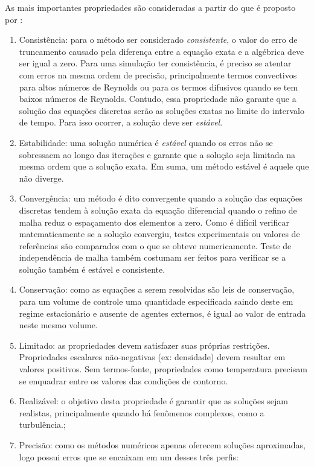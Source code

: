 As mais importantes propriedades são consideradas a partir do que é proposto por \citeauthor{Ferziger&Peric2020}:

\begin{enumerate}
    \item Consistência: para o método ser considerado \textit{consistente}, o valor do erro de truncamento causado pela diferença entre a equação exata e a algébrica deve ser igual a zero. Para uma simulação ter consistência, é preciso se atentar com erros na mesma ordem de precisão, principalmente termos convectivos para altos números de Reynolds ou para os termos difusivos quando se tem baixos números de Reynolds. Contudo, essa propriedade não garante que a solução das equações discretas serão as soluções exatas no limite do intervalo de tempo. Para isso ocorrer, a solução deve ser \textit{estável}.
    \item Estabilidade: uma solução numérica é \textit{estável} quando os erros não se sobressaem ao longo das iterações e garante que a solução seja limitada na mesma ordem que a solução exata. Em suma, um método estável é aquele que não diverge.
    \item Convergência: um método é dito convergente quando a solução das equações discretas tendem à solução exata da equação diferencial quando o refino de malha reduz o espaçamento dos elementos a zero. Como é difícil verificar matematicamente se a solução convergiu, testes experimentais ou valores de referências são comparados com o que se obteve numericamente. Teste de independência de malha também costumam ser feitos para verificar se a solução também é estável e consistente.
    \item Conservação: como as equações a serem resolvidas são leis de conservação, para um volume de controle uma quantidade especificada saindo deste em regime estacionário e ausente de agentes externos, é igual ao valor de entrada neste mesmo volume.
    \item Limitado: as propriedades devem satisfazer suas próprias restrições. Propriedades escalares não-negativas (ex: densidade) devem resultar em valores positivos. Sem termos-fonte, propriedades como temperatura precisam se enquadrar entre os valores das condições de contorno.
    \item Realizável: o objetivo desta propriedade é garantir que as soluções sejam realistas, principalmente quando há fenômenos complexos, como a turbulência.;
    \item Precisão: como os métodos numéricos apenas oferecem soluções aproximadas, logo possui erros que se encaixam em um desses três perfis:

\end{enumerate}
